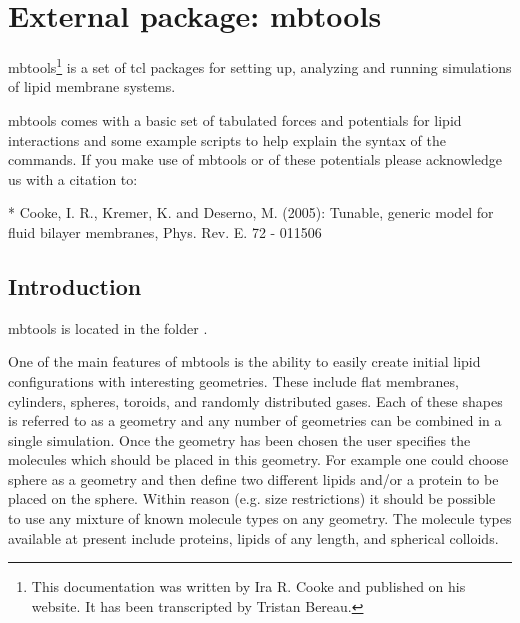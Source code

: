 %  
%   
%  
%  
%
\chapter{External package: mbtools}
\label{chap:mbtools}


mbtools\footnote{This documentation was written by Ira R. Cooke and published on his website. It has been transcripted by Tristan Bereau.} is a set of tcl packages for setting up, analyzing and running simulations of lipid membrane systems.

 mbtools comes with a basic set of tabulated forces and potentials for lipid interactions and some example scripts to help explain the syntax of the commands. If you make use of mbtools or of these potentials please acknowledge us with a citation to:

    * Cooke, I. R., Kremer, K. and Deserno, M. (2005): Tunable, generic model for fluid bilayer membranes, Phys. Rev. E. 72 - 011506

\section{Introduction}

mbtools is located in the folder .

One of the main features of mbtools is the ability to easily create initial lipid configurations with interesting geometries. These include flat membranes, cylinders, spheres, toroids, and randomly distributed gases. Each of these shapes is referred to as a geometry and any number of geometries can be combined in a single simulation. Once the geometry has been chosen the user specifies the molecules which should be placed in this geometry. For example one could choose sphere as a geometry and then define two different lipids and/or a protein to be placed on the sphere. Within reason (e.g. size restrictions) it should be possible to use any mixture of known molecule types on any geometry. The molecule types available at present include proteins, lipids of any length, and spherical colloids.

